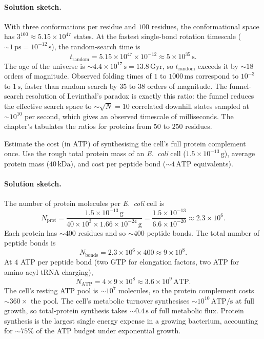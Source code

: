 \paragraph{Solution sketch.}
With three conformations per residue and $100$ residues, the
conformational space has $3^{100} \approx 5.15 \times 10^{47}$
states. At the fastest single-bond rotation timescale
($\sim 1\,\text{ps} = 10^{-12}\,\text{s}$), the random-search time is
\[
t_{\text{random}} = 5.15 \times 10^{47} \times 10^{-12}
\approx 5 \times 10^{35}\,\text{s}.
\]
The age of the universe is $\sim 4.4 \times 10^{17}\,\text{s} =
13.8\,\text{Gyr}$, so $t_{\text{random}}$ exceeds it by $\sim 18$
orders of magnitude. Observed folding times of $1$ to $1000\,\text{ms}$
correspond to $10^{-3}$ to $1\,\text{s}$, faster than random search
by $35$ to $38$ orders of magnitude. The funnel-search resolution of
Levinthal's paradox is exactly this ratio: the funnel reduces the
effective search space to $\sim \sqrt{N} = 10$ correlated downhill
states sampled at $\sim 10^{10}$ per second, which gives an observed
timescale of milliseconds. The chapter's
 tabulates the ratios for proteins
from $50$ to $250$ residues.

\begin{exercise}
Estimate the cost (in ATP) of synthesising the cell's full protein
complement once. Use the rough total protein mass of an
\emph{E.~coli} cell ($1.5 \times 10^{-13}\,\text{g}$), average
protein mass ($40\,\text{kDa}$), and cost per peptide bond
($\sim 4\,\text{ATP}$ equivalents).
\end{exercise}

\paragraph{Solution sketch.}
The number of protein molecules per \emph{E.~coli} cell is
\[
N_{\text{prot}} = \frac{1.5 \times 10^{-13}\,\text{g}}{40 \times 10^3 \times 1.66 \times 10^{-24}\,\text{g}}
= \frac{1.5 \times 10^{-13}}{6.6 \times 10^{-20}}
\approx 2.3 \times 10^{6}.
\]
Each protein has $\sim 400$ residues and so $\sim 400$ peptide bonds.
The total number of peptide bonds is
\[
N_{\text{bonds}} = 2.3 \times 10^{6} \times 400 \approx 9 \times 10^{8}.
\]
At $4$ ATP per peptide bond (two GTP for elongation factors, two ATP
for amino-acyl tRNA charging),
\[
N_{\text{ATP}} = 4 \times 9 \times 10^{8} \approx 3.6 \times 10^{9}\,\text{ATP}.
\]
The cell's resting ATP pool is $\sim 10^{7}$ molecules, so the protein
complement costs $\sim 360\times$ the pool. The cell's metabolic
turnover synthesises $\sim 10^{10}\,\text{ATP}/\text{s}$ at full
growth, so total-protein synthesis takes $\sim 0.4\,\text{s}$ of full
metabolic flux. Protein synthesis is the largest single energy
expense in a growing bacterium, accounting for $\sim 75\%$ of the
ATP budget under exponential growth.

